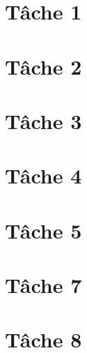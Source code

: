 \documentclass[a4paper,oneside,12pt]{report}
\begin{document}


\tableofcontents

\chapter{T\^ache 1}
%

\chapter{T\^ache 2}
%

\chapter{T\^ache 3}

\chapter{T\^ache 4}
%

\chapter{T\^ache 5}
%

\chapter{T\^ache 7}
%

\chapter{T\^ache 8}
%


\printbibliography
\end{document}
